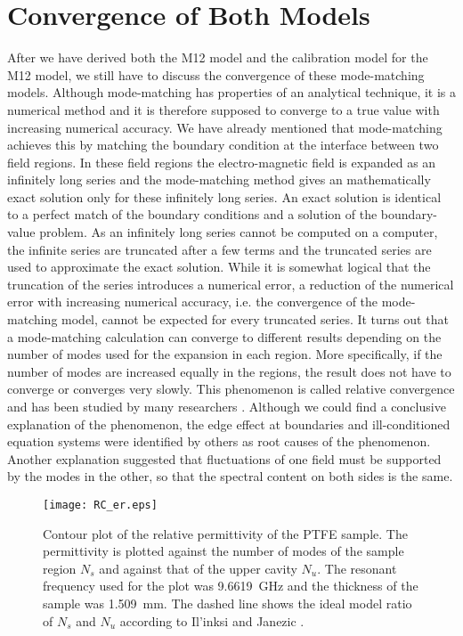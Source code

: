 \section{Convergence of Both Models}
After we have derived both the M12 model and the calibration model for the M12 model, we still have to discuss the convergence of these mode-matching models. Although mode-matching has properties of an analytical technique, it is a numerical method and it is therefore supposed to converge to a true value with increasing numerical accuracy. We have already mentioned that mode-matching achieves this by matching the boundary condition at the interface between two field regions. In these field regions the electro-magnetic field is expanded as an infinitely long series and the mode-matching method gives an mathematically exact solution only for these infinitely long series. An exact solution is identical to a perfect match of the boundary conditions and a solution of the boundary-value problem. As an infinitely long series cannot be computed on a computer, the infinite series are truncated after a few terms and the truncated series are used to approximate the exact solution. While it is somewhat logical that the truncation of the series introduces a numerical error, a reduction of the numerical error with increasing numerical accuracy, i.e. the convergence of the mode-matching model, cannot be expected for every truncated series. It turns out that a mode-matching calculation can converge to different results depending on the number of modes used for the expansion in each region. More specifically, if the number of modes are increased equally in the regions, the result does not have to converge or converges very slowly. This phenomenon is called relative convergence and has been studied by many researchers \cite{itoh, mittra, leroy, sorrentino}. Although we could find a conclusive explanation of the phenomenon, the edge effect at boundaries \cite{mittra} and ill-conditioned equation systems \cite{leroy} were identified by others as root causes of the phenomenon. Another explanation suggested that fluctuations of one field must be supported by the modes in the other, so that the spectral content on both sides is the same.

\begin{figure}
\centering
\texttt{[image: RC\_er.eps]}
\caption{Contour plot of the relative permittivity of the PTFE sample. The permittivity is plotted against the number of modes of the sample region $N_s$ and against that of the upper cavity $N_u$. The resonant frequency used for the plot was \SI{9.6619}{\giga\hertz} and the thickness of the sample was \SI{1.509}{\milli\meter}. The dashed line shows the ideal model ratio of $N_s$ and $N_u$ according to Il'inksi \cite{ilinski} and Janezic \cite{janezic}.}\label{fig:RCer}
\end{figure}

